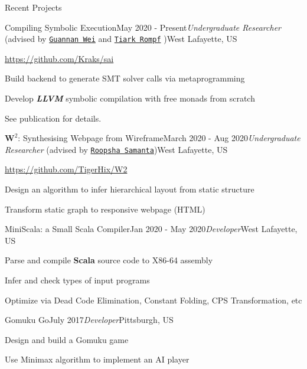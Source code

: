 \documentclass{resume} %
\begin{document}
\begin{rSection}{Recent Projects}

\begin{rSubsection}{Compiling Symbolic Execution}{May 2020 - Present}{\textit{Undergraduate Researcher} (advised by \href{http://continuation.passing.style/}{\texttt{Guannan Wei}} and \href{http://tiarkrompf.github.io/}{\texttt{Tiark Rompf}} )}{West Lafayette, US}
\item \url{https://github.com/Kraks/sai}
\item Build backend to generate SMT solver calls via metaprogramming
\item Develop \textbf{\it LLVM} symbolic compilation with free monads from scratch
\item See publication for details.
\end{rSubsection}


\begin{rSubsection}{$\mathbf{W}^2$: Synthesising Webpage from Wireframe}{March 2020 - Aug 2020}{\textit{Undergraduate Researcher} (advised by \href{https://www.cs.purdue.edu/homes/roopsha/}{\texttt{Roopsha Samanta}})}{West Lafayette, US}
\item \url{https://github.com/TigerHix/W2}
\item Design an algorithm to infer hierarchical layout from static structure
\item Transform static graph to responsive webpage (HTML)

\end{rSubsection}

\begin{rSubsection}{MiniScala: a Small Scala Compiler}{Jan 2020 - May 2020}{\textit{Developer}}{West Lafayette, US}
\item Parse and compile \textbf{Scala} source code to X86-64 assembly
\item Infer and check types of input programs
\item Optimize via Dead Code Elimination, Constant Folding, CPS Transformation, etc

\end{rSubsection}

\begin{rSubsection}{Gomuku Go}{July 2017}{\textit{Developer}}{Pittsburgh, US}
\item Design and build a Gomuku game 
\item Use Minimax algorithm to implement an AI player
\end{rSubsection}


\end{rSection}
\end{document}
